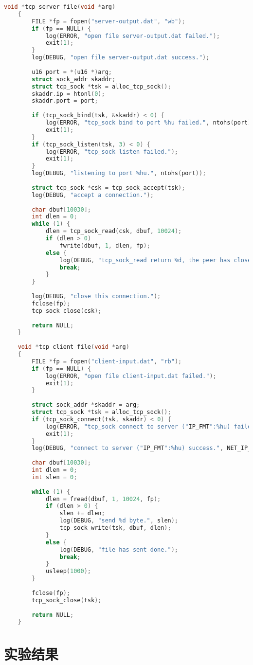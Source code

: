 \documentclass[UTF8]{report}
\begin{document}
\begin{lstlisting}[language=C]
    void *tcp_server_file(void *arg)
    {
        FILE *fp = fopen("server-output.dat", "wb");
        if (fp == NULL) {
            log(ERROR, "open file server-output.dat failed.");
            exit(1);
        }
        log(DEBUG, "open file server-output.dat success.");
    
        u16 port = *(u16 *)arg;
        struct sock_addr skaddr;
        struct tcp_sock *tsk = alloc_tcp_sock();
        skaddr.ip = htonl(0);
        skaddr.port = port;
    
        if (tcp_sock_bind(tsk, &skaddr) < 0) {
            log(ERROR, "tcp_sock bind to port %hu failed.", ntohs(port));
            exit(1);
        }
        if (tcp_sock_listen(tsk, 3) < 0) {
            log(ERROR, "tcp_sock listen failed.");
            exit(1);
        }
        log(DEBUG, "listening to port %hu.", ntohs(port));
    
        struct tcp_sock *csk = tcp_sock_accept(tsk);
        log(DEBUG, "accept a connection.");
    
        char dbuf[10030];
        int dlen = 0;
        while (1) {
            dlen = tcp_sock_read(csk, dbuf, 10024);
            if (dlen > 0)
                fwrite(dbuf, 1, dlen, fp);
            else {
                log(DEBUG, "tcp_sock_read return %d, the peer has closed.", dlen);
                break;
            }
        }
    
        log(DEBUG, "close this connection.");
        fclose(fp);
        tcp_sock_close(csk);
    
        return NULL;
    }
    
    void *tcp_client_file(void *arg)
    {
        FILE *fp = fopen("client-input.dat", "rb");
        if (fp == NULL) {
            log(ERROR, "open file client-input.dat failed.");
            exit(1);
        }
    
        struct sock_addr *skaddr = arg;
        struct tcp_sock *tsk = alloc_tcp_sock();
        if (tcp_sock_connect(tsk, skaddr) < 0) {
            log(ERROR, "tcp_sock connect to server ("IP_FMT":%hu) failed.", NET_IP_FMT_STR(skaddr->ip), ntohs(skaddr->port));
            exit(1);
        }
        log(DEBUG, "connect to server ("IP_FMT":%hu) success.", NET_IP_FMT_STR(skaddr->ip), ntohs(skaddr->port));
    
        char dbuf[10030];
        int dlen = 0;
        int slen = 0;
    
        while (1) {
            dlen = fread(dbuf, 1, 10024, fp);
            if (dlen > 0) {
                slen += dlen;
                log(DEBUG, "send %d byte.", slen);
                tcp_sock_write(tsk, dbuf, dlen);
            }
            else {
                log(DEBUG, "file has sent done.");
                break;
            }
            usleep(1000);
        }
    
        fclose(fp);
        tcp_sock_close(tsk);
    
        return NULL;
    }
\end{lstlisting}

\section{实验结果}
\end{document}

